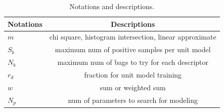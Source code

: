 \documentclass[11pt,twocolumn,twoside]{IEEEtran}
\begin{document}
\begin{table}[h]\scriptsize
 \centering \caption{Notations and descriptions. }
\begin{tabular}{|l|c|}
\hline Notations        & Descriptions      \\
\hline
\hline $m$              & chi square, histogram intersection, linear approximate    \\
\hline $S_{b}$          & maximum num of positive samples per unit model            \\
\hline $N_{b}$          & maximum num of bags to try for each descriptor           \\
\hline $r_{d}$          & fraction for unit model training           \\
\hline $w$              & sum or weighted sum          \\
\hline $N_{p}$          & num of parameters to search for modeling         \\
\hline
\end{tabular}
\label{tb:para}
\end{table}
\end{document}
